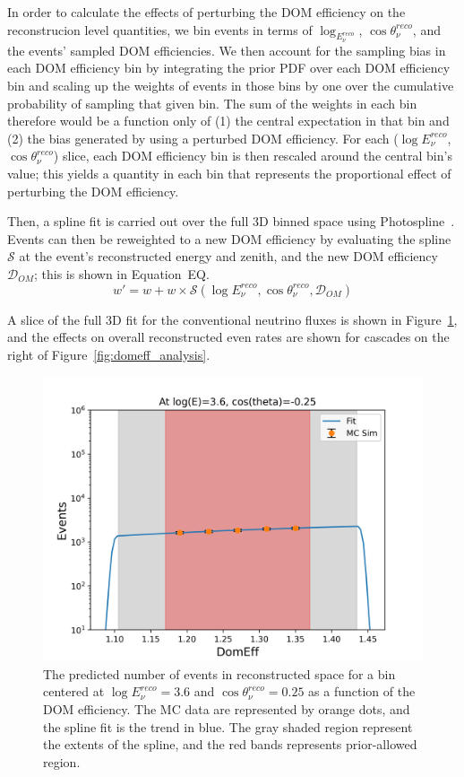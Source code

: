 \documentclass[main.tex]{subfiles}
\begin{document}
In order to calculate the effects of perturbing the DOM efficiency on the reconstrucion level quantities, we bin events in terms of $\log_{E_{\nu}^{reco}}$, $\cos\theta_{\nu}^{reco}$, and the events' sampled DOM efficiencies. 
We then account for the sampling bias in each DOM efficiency bin by integrating the prior PDF over each DOM efficiency bin and scaling up the weights of events in those bins by one over the cumulative probability of sampling that given bin. 
The sum of the weights in each bin therefore would be a function only of (1) the central expectation in that bin and (2) the bias generated by using a perturbed DOM efficiency. 
For each ($\log E_{\nu}^{reco}$, $\cos\theta_{\nu}^{reco}$) slice, each DOM efficiency bin is then rescaled around the central bin's value; this yields a quantity in each bin that represents the proportional effect of perturbing the DOM efficiency. 

Then, a spline fit is carried out over the full 3D binned space using Photospline~\cite{WHITEHORN20132214}. 
Events can then be reweighted to a new DOM efficiency by evaluating the spline $\mathcal{S}$ at the event's reconstructed energy and zenith, and the new DOM efficiency $\mathcal{D}_{OM}$; this is shown in Equation~EQ.
\begin{equation}\label{eq:domeff}
    w' = w + w\times \mathcal{S}(\log E_{\nu}^{reco}, \cos\theta_{\nu}^{reco}, \mathcal{D}_{OM})
\end{equation}

A slice of the full 3D fit for the conventional neutrino fluxes is shown in Figure~\ref{fig:domeff_fit}, and the effects on overall reconstructed even rates are shown for cascades on the right of Figure~\ref{fig:domeff_analysis}.
\begin{figure}
    \centering
    \includegraphics[width=0.75\linewidth]{figures/atmConv_logE_3.6_cosz_-0.25.png}
    \caption{The predicted number of events in reconstructed space for a bin centered at $\log E_{\nu}^{reco}=3.6$ and $\cos\theta_{\nu}^{reco}=0.25$ as a function of the DOM efficiency. The MC data are represented by orange dots, and the spline fit is the trend in blue. The gray shaded region represent the extents of the spline, and the red bands represents prior-allowed region.}\label{fig:domeff_fit}
\end{figure}
\end{document}

